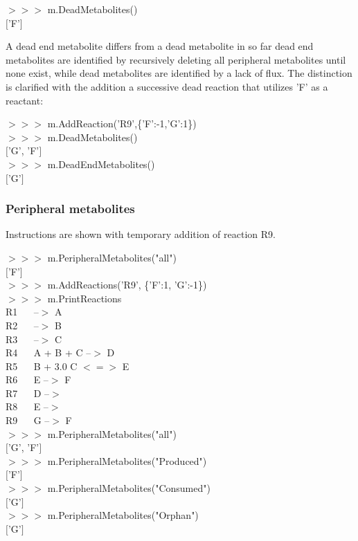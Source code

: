 \begin{framed}
$>>>$ m.DeadMetabolites()\\
$[$'F'$]$
\end{framed}

A dead end metabolite differs from a dead metabolite in so far dead end metabolites are identified by recursively deleting all peripheral metabolites until none exist, while dead metabolites are identified by a lack of flux. The distinction is clarified with the addition a successive dead reaction that utilizes 'F' as a reactant:

\begin{framed}
$>>>$ m.AddReaction('R9',\{'F':-1,'G':1\})\\
$>>>$ m.DeadMetabolites()\\
$[$'G', 'F'$]$\\

$>>>$ m.DeadEndMetabolites()\\
$[$'G'$]$
\end{framed}


\subsubsection{Peripheral metabolites}
Instructions are shown with temporary addition of reaction R9.

\begin{framed}
$>>>$ m.PeripheralMetabolites("all")\\
$[$'F'$]$\\

$>>>$ m.AddReactions('R9', \{'F':1, 'G':-1\})\\
$>>>$ m.PrintReactions\\
R1 $\quad$ --$>$ A\\
R2 $\quad$ --$>$ B\\
R3 $\quad$ --$>$ C\\
R4 $\quad$ A + B + C --$>$ D\\
R5 $\quad$ B + 3.0 C $<=>$ E\\
R6 $\quad$ E --$>$ F\\
R7 $\quad$ D --$>$\\
R8 $\quad$ E --$>$\\
R9 $\quad$ G --$>$ F\\

$>>>$ m.PeripheralMetabolites("all")\\
$[$'G', 'F'$]$\\

$>>>$ m.PeripheralMetabolites("Produced")\\
$[$'F'$]$\\

$>>>$ m.PeripheralMetabolites("Consumed")\\
$[$'G'$]$\\

$>>>$ m.PeripheralMetabolites("Orphan")\\
$[$'G'$]$
\end{framed}

